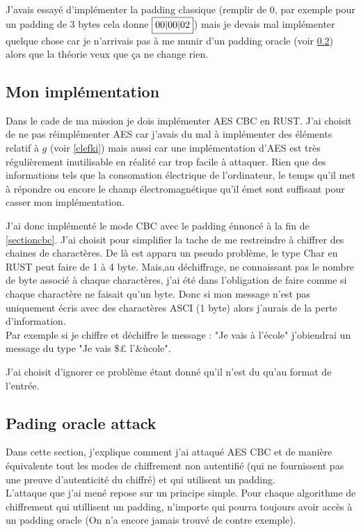 \documentclass[a4paper, 12pt]{article}
\begin{document}
J'avais essayé d'implémenter la padding classique (remplir de $0$, par exemple pour un padding de 3 bytes cela donne $\fbox{00|00|02}$) mais je devais mal implémenter quelque chose car je n'arrivais pas à me munir d'un padding oracle (voir \ref{padoracle}) alors que la théorie veux que ça ne change rien.

\subsection{Mon implémentation}
Dans le cade de ma mission je dois implémenter AES CBC en RUST. 
J'ai choisit de ne pas réimplémenter AES car j'avais du mal à implémenter des éléments relatif à $g$ (voir \ref{clefki}) mais aussi car une implémentation d'AES est très régulièrement inutilisable en réalité car trop facile à attaquer. Rien que des informations tels que la consomation électrique de l'ordinateur, le temps qu'il met à répondre ou encore le champ électromagnétique qu'il émet sont suffisant pour casser mon implémentation. 

J'ai donc implémenté le mode CBC avec le padding énnoncé à la fin de \ref{sectioncbc}. J'ai choisit pour simplifier la tache de me restreindre à chiffrer des chaines de charactères. De là est apparu un pseudo problème, le type Char en RUST peut faire de 1 à 4 byte. Mais,au déchiffrage, ne connaissant pas le nombre de byte associé à chaque charactères, j'ai été dans l'obligation de faire comme si chaque charactère ne faisait qu'un byte. Donc si mon message n'est pas uniquement écris avec des charactères ASCI (1 byte) alors j'aurais de la perte d'information. \\
Par exemple si je chiffre et déchiffre le message : "Je vais à l'école" j'obiendrai un message du type "Je vais \$£ l'\&ùcole".

J'ai choisit d'ignorer ce problème étant donné qu'il n'est du qu'au format de l'entrée.

\subsection{Pading oracle attack}\label{padoracle}
Dans cette section, j'explique comment j'ai attaqué AES CBC et de manière équivalente tout les modes de chiffrement non autentifié (qui ne fournissent pas une preuve d'autenticité du chiffré) et qui utilisent un padding. \\ 

L'attaque que j'ai mené repose sur un principe simple. Pour chaque algorithme de chiffrement qui utillisent un padding, n'importe qui pourra toujours avoir accès à un padding oracle (On n'a encore jamais trouvé de contre exemple). 
\end{document}
